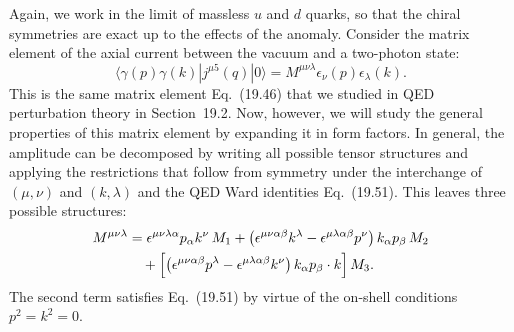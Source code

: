 Again, we work in the limit of massless $u$ and $d$ quarks, so that the
chiral symmetries are exact up to the effects of the anomaly.  Consider the
matrix element of the axial current between the vacuum and a two-photon
state:
\begin{equation}
  \langle \gamma(p)\gamma(k)|j^{\mu 5}(q)|0\rangle = M^{\mu\nu\lambda}
    \epsilon_\nu(p)\epsilon_\lambda(k) .
  \label{eq:19.109}
\end{equation}
This is the same matrix element Eq.~(19.46) that we studied in QED
perturbation theory in Section~19.2.  Now, however, we will study the general
properties of this matrix element by expanding it in form factors.  In
general, the amplitude can be decomposed by writing all possible tensor
structures and applying the restrictions that follow from symmetry under the
interchange of $(\mu,\nu)$ and $(k,\lambda)$ and the QED Ward identities
Eq.~(19.51).  This leaves three possible structures:
\begin{equation}
  \begin{aligned}
    M^{\mu\nu\lambda} &= \epsilon^{\mu\nu\lambda\alpha} p_\alpha k^\nu\,
      M_1 + \bigl( \epsilon^{\mu\nu\alpha\beta}k^\lambda - \epsilon^{\mu\lambda
        \alpha\beta}p^\nu \bigr)\,k_\alpha p_\beta\,M_2\\
    &\quad + \Bigl[ \bigl( \epsilon^{\mu\nu\alpha\beta}p^\lambda
      - \epsilon^{\mu\lambda\alpha\beta}k^\nu \bigr)\,k_\alpha p_\beta
      \cdot k \Bigr]\,M_3 .
  \end{aligned}
  \label{eq:19.110}
\end{equation}
The second term satisfies Eq.~(19.51) by virtue of the on-shell
conditions $p^2 = k^2 = 0$.

